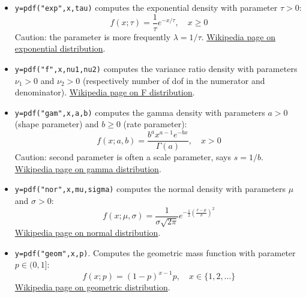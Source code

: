 \begin{mandescription}
\begin{itemize}


\item {} \verb!y=pdf("exp",x,tau)! computes the exponential
  density with parameter $\tau > 0$:
$$
     f(x; \tau) = \frac{1}{\tau} e^{-x/\tau}, \quad x \ge 0
$$
Caution: the parameter is more frequently $\lambda = 1/\tau$.
\href{http://en.wikipedia.org/wiki/Exponential_distribution}{Wikipedia page on exponential distribution}.


\item {} \verb!y=pdf("f",x,nu1,nu2)! computes
  the variance ratio density with parameters $\nu_1 > 0$ and $\nu_2 >
  0$ (respectively number of dof in the numerator and denominator).
\href{http://en.wikipedia.org/wiki/F-distribution}{Wikipedia page on F distribution}.


\item {} \verb!y=pdf("gam",x,a,b)! computes the gamma
  density with parameters $a > 0$ (shape parameter) and $b \ge 0$
  (rate parameter):
$$
     f(x; a, b) = \frac{ b^a x^{a-1} e^{-bx} } {\Gamma(a)}, \quad x > 0
$$
Caution: second parameter is often a scale parameter, says $s = 1/b$.
\href{http://en.wikipedia.org/wiki/Gamma_distribution}{Wikipedia page on gamma distribution}.

\item {} \verb!y=pdf("nor",x,mu,sigma)! computes the normal
  density with parameters $\mu$ and $\sigma > 0$:
$$
     f(x; \mu, \sigma) = \frac{ 1 }{ \sigma \sqrt{2\pi}}
     e^{-\frac{1}{2} \left( \frac{x-\mu}{\sigma} \right)^2 }
$$
\href{http://en.wikipedia.org/wiki/Normal_distribution}{Wikipedia page on normal distribution}.


\item {} \verb!y=pdf("geom",x,p)!. Computes
  the geometric mass function with parameter $p \in (0,1]$:
$$
     f(x; p) = (1-p)^{x-1} p, \quad x \in \{1, 2, \dots\}
$$
\href{http://en.wikipedia.org/wiki/Geometric_distribution}{Wikipedia page on geometric distribution}.


\end{itemize}
\end{mandescription}
